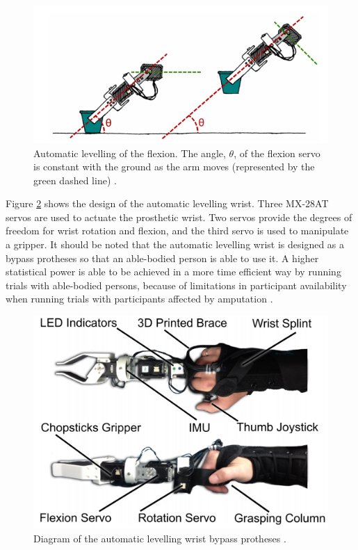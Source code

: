 \documentclass[letterpaper,12pt]{article}
\begin{document}
\begin{figure}[H]
\centering \includegraphics[width=0.8\columnwidth]{auto_levelling.png}
\caption{\label{fig:auto_levelling}Automatic levelling of the flexion. The angle, $\theta$, of the flexion servo is constant with the ground as the arm moves (represented by the green dashed line) \cite{d.j.a.brenneis}.}
\end{figure}

Figure \ref{fig:slw_diagram} shows the design of the automatic levelling wrist. Three MX-28AT servos are used to actuate the prosthetic wrist. Two servos provide the degrees of freedom for wrist rotation and flexion, and the third servo is used to manipulate a gripper. It should be noted that the automatic levelling wrist is designed as a bypass protheses so that an able-bodied person is able to use it. A higher statistical power is able to be achieved in a more time efficient way by running trials with able-bodied persons, because of limitations in participant availability when running trials with participants affected by amputation \cite{d.j.a.brenneis}.

\begin{figure}[H]
\centering \includegraphics[width=0.8\columnwidth]{slw_diagram.png}
\caption{\label{fig:slw_diagram}Diagram of the automatic levelling wrist bypass protheses \cite{d.j.a.brenneis}.}
\end{figure}
\end{document}
